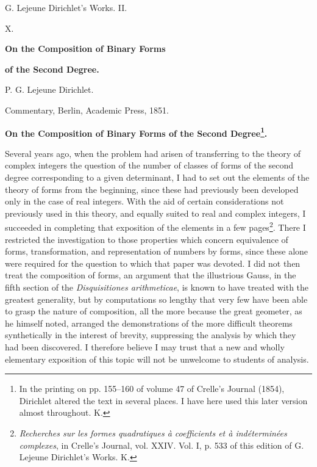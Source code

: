 \documentclass[11pt]{article}
\begin{document}
\begin{center}
{\Large G. Lejeune Dirichlet's Works. II.}\par\vspace{1.2em}
{\Large X.}\par\vspace{0.5em}
{\LARGE \textbf{On the Composition of Binary Forms}}\par
{\LARGE \textbf{of the Second Degree.}}\par\vspace{1em}
{\large P. G. Lejeune Dirichlet.}\par\vspace{0.5em}
{\small Commentary, Berlin, Academic Press, 1851.}
\end{center}

\begin{center}
{\large \textbf{On the Composition of Binary Forms of the Second Degree\footnote{In the printing on pp. 155--160 of volume 47 of Crelle's Journal (1854), Dirichlet altered the text in several places. I have here used this later version almost throughout. K.}.}}
\end{center}

Several years ago, when the problem had arisen of transferring to the theory of complex integers the question of the number of classes of forms of the second degree corresponding to a given determinant, I had to set out the elements of the theory of forms from the beginning, since these had previously been developed only in the case of real integers. With the aid of certain considerations not previously used in this theory, and equally suited to real and complex integers, I succeeded in completing that exposition of the elements in a few pages\footnote{\emph{Recherches sur les formes quadratiques à coefficients et à indéterminées complexes}, in Crelle's Journal, vol. XXIV. Vol. I, p. 533 of this edition of G. Lejeune Dirichlet's Works. K.}. There I restricted the investigation to those properties which concern equivalence of forms, transformation, and representation of numbers by forms, since these alone were required for the question to which that paper was devoted. I did not then treat the composition of forms, an argument that the illustrious Gauss, in the fifth section of the \emph{Disquisitiones arithmeticae}, is known to have treated with the greatest generality, but by computations so lengthy that very few have been able to grasp the nature of composition, all the more because the great geometer, as he himself noted, arranged the demonstrations of the more difficult theorems synthetically in the interest of brevity, suppressing the analysis by which they had been discovered. I therefore believe I may trust that a new and wholly elementary exposition of this topic will not be unwelcome to students of analysis.
\end{document}
